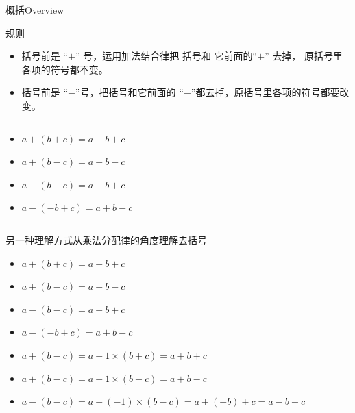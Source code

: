 \documentclass{beamer}
\begin{document}
    \begin{frame}{概括}{Overview}

            \begin{block}{规则}
                \begin{itemize}
                    \item 括号前是 “$\bm{+}$” 号，运用加法结合律把
                    括号和 它前面的“$\bm{+}$”
                    去掉， 原括号里各项的符号都\alert{不变}。
                    \item 括号前是 “$\bm{-}$”号，把括号和它前面的
                     “$\bm{-}$”都去掉，原括号里各项的符号都要\alert{改变}。
                \end{itemize}
            \end{block}


            \begin{columns}
                \begin{example}
                    \begin{itemize}
                        \item $a+(b+c) = a + b +c$
                        \item $a+(b-c) = a + b - c$ 
                        \item $a-(b-c) = a -b + c$ 
                        \item $a-(-b+c) = a + b -c $
                    \end{itemize}
                \end{example}

            \end{columns}
    \end{frame}

    \begin{frame}{另一种理解方式}{从乘法分配律的角度理解去括号}
                \begin{alertblock}{}
                    \begin{itemize}
                        \item $a+(b+c) = a + b +c$
                        \item $a+(b-c) = a + b - c$ 
                        \item $a-(b-c) = a -b + c$ 
                        \item $a-(-b+c) = a + b -c $
                    \end{itemize}
                \end{alertblock}

                \begin{block}{}
                    \begin{itemize}
                        \item $a+(b-c) = a + 1 \times (b +c)=a + b + c$
                        \item $a+(b-c) = a + 1 \times (b -c)=a + b - c$
                        \item $a-(b-c) = a + (-1) \times (b-c)=a+(-b)+c=a-b+c$ 
                    \end{itemize}
                \end{block}
    \end{frame}
\end{document}

